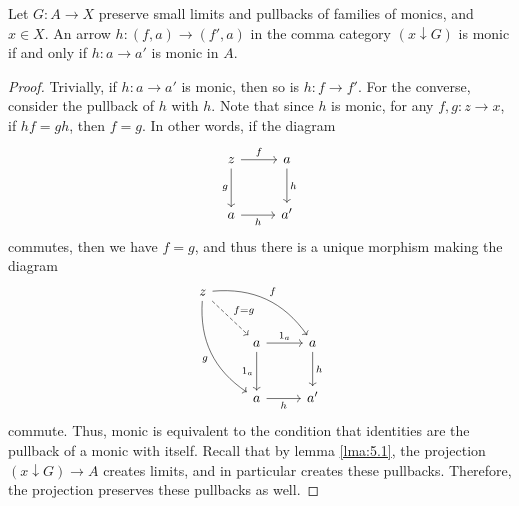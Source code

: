\begin{lemma}\label{lma:5.4}
	Let $G : A \to X$ preserve small limits and pullbacks of families of monics, and $x\in X$. An arrow $h : (f,a) \to (f',a)$ in the comma category $(x\downarrow G)$ is monic if and only if $h : a \to a'$ is monic in $A$.
\end{lemma}
\begin{proof}
	Trivially, if $h : a \to a'$ is monic, then so is $h : f \to f'$. For the converse, consider the pullback of $h$ with $h$. Note that since $h$ is monic, for any $f,g : z \to x$, if $hf=gh$, then $f=g$. In other words, if the diagram
	\[\begin{tikzcd}[row sep = 2.5em, column sep = 2.5em]
	z\ar[" f ", r] \ar[" g "', d]  & a\ar[" h ", d]  \\
	a\ar[" h "', r]  & a'
	\end{tikzcd}\]
	commutes, then we have $f=g$, and thus there is a unique morphism making the diagram
	\[\begin{tikzcd}[row sep = 2.5em, column sep = 2.5em]
	z\ar[" f ", bend left, drr] \ar[" g "', bend right, ddr] \ar[" f=g ", dashed, dr] &  &  \\
	 & a\ar[" 1_a ", r] \ar[" 1_a "', d]  & a\ar[" h ", d]  \\
	 & a \ar[" h "', r] & a'
	\end{tikzcd}\]
	commute. Thus, monic is equivalent to the condition that identities are the pullback of a monic with itself. Recall that by lemma \ref{lma:5.1}, the projection $(x\downarrow G)\to A$ creates limits, and in particular creates these pullbacks. Therefore, the projection preserves these pullbacks as well.
\end{proof}

